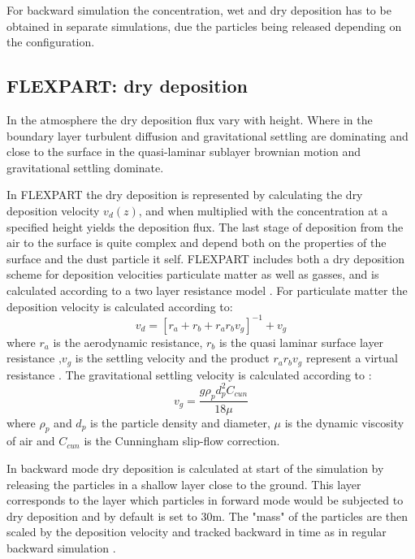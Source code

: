 For backward simulation the concentration, wet and dry deposition has to be obtained in separate simulations, due  the particles being released depending on the configuration.  
\subsection{FLEXPART: dry deposition}
In the atmosphere the dry deposition flux vary with height. Where in the boundary layer turbulent diffusion and gravitational settling are dominating and close to the surface in the quasi-laminar sublayer brownian motion and gravitational settling dominate. 

In FLEXPART the dry deposition is represented by calculating the dry deposition velocity $v_d(z)$, and when multiplied with the concentration at a specified height yields the deposition flux. The last stage of deposition from the air to the surface is quite complex and depend both on the properties of the surface and the dust particle it self. 
FLEXPART includes both a dry deposition scheme for deposition velocities particulate matter as well as gasses, and is calculated according to a two layer resistance model \parencite{Flexpart-2005_ref_paper}. For particulate matter the deposition velocity is calculated according to:
\begin{equation}
    v_d=[r_a + r_b + r_a r_b v_g]^{-1} + v_g
\end{equation}
where $r_a$ is the aerodynamic resistance, $r_b$ is the quasi laminar surface layer resistance ,$v_g$ is the settling velocity and the product $r_a r_b v_g$ represent a virtual resistance \parencite{GIARDINA201811_drydepo}. The gravitational settling velocity is calculated according to \textcite{slinn1982predictions}:
\begin{equation}
    v_g = \frac{g\rho_p d_p^2 C_{cun}}{18\mu}
\end{equation}
where $\rho_p$ and $d_p$ is the particle density and diameter, $\mu$ is the dynamic viscosity of air and $C_{cun}$ is the Cunningham slip-flow correction.

In backward mode dry deposition is calculated at start of the simulation by releasing the particles in a shallow layer close to the ground. This layer corresponds to the layer which particles in forward mode would be subjected to dry deposition and by default is set to 30m. The "mass" of the particles are then scaled by the deposition velocity and tracked backward in time as in regular backward simulation \parencite{eckhardt2017source}. 

